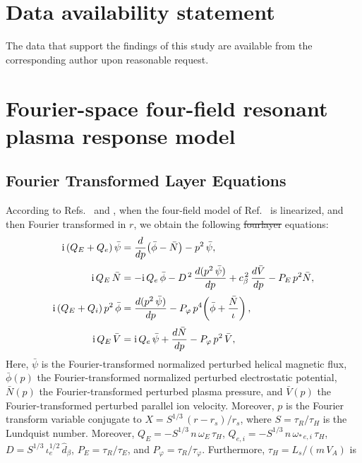 \documentclass[12pt,prb,aps]{revtex4-1}
\providecommand{\DIFadd}[1]{{\protect\color{blue}\uwave{#1}}} %
\providecommand{\DIFdel}[1]{{\protect\color{red}\sout{#1}}}                      %
\providecommand{\DIFaddbegin}{} %
\providecommand{\DIFaddend}{} %
\providecommand{\DIFdelbegin}{} %
\providecommand{\DIFdelend}{} %
\begin{document}
\section*{Data availability statement}
The data that support the findings of this study are available from the corresponding author upon reasonable request.

\appendix
\section{Fourier-space four-field resonant plasma response model}\label{sfour}

\subsection{Fourier Transformed Layer Equations}
According to Refs.~ and , when the four-field model of Ref.~ is linearized, and then Fourier transformed in
$r$,  we obtain the following \DIFdelbegin \DIFdel{fourlayer }\DIFdelend \DIFaddbegin \DIFadd{four-field  }\DIFaddend equations:
\begin{align}\label{e314}
{\rm i}\,(Q_E+Q_e)\,\bar{\psi}&=\frac{d}{dp}\!\left(\bar{\phi}-\bar{N}\right)-p^2\,\bar{\psi},\\[0.5ex]
{\rm i}\,Q_E\,\bar{N} &= - {\rm i}\,Q_{e}\,\bar{\phi} -D^{\,2}\,\frac{d(p^2\,\bar{\psi})}{dp}+ c_\beta^{\,2}\,\frac{d\bar{V}}{dp}
  - P_E\,p^2\bar{N},\label{e316}\\[0.5ex]
{\rm i}\,(Q_E+Q_i)\,p^2\,\bar{\phi}&=  \frac{d(p^2\,\bar{\psi})}{dp}- P_\varphi\,p^4\!\left(\bar{\phi} + \frac{\bar{N}}{\iota}\right),\label{e316a}\\[0.5ex]
{\rm i}\,Q_E\,\bar{V} &= {\rm i}\,Q_{e}\,\bar{\psi} +\frac{d\bar{N}}{dp}- P_\varphi\,p^2\,\bar{V},\label{e317}
\end{align}
Here, $\bar{\psi}$ is the Fourier-transformed normalized perturbed helical magnetic flux, $\bar{\phi}(p)$  the Fourier-transformed normalized perturbed
electrostatic potential, $\bar{N}(p)$  the Fourier-transformed perturbed plasma pressure, and $\bar{V}(p)$  the Fourier-transformed perturbed parallel
ion velocity. Moreover, $p$ is the Fourier transform variable conjugate to $X=S^{1/3}\,(r-r_s)/r_s$, where $S=\tau_R/\tau_H$ is the Lundquist number. 
Moreover, $Q_E=-S^{1/3}\,n\,\omega_E\,\tau_H$, $Q_{e,i}=-S^{1/3}\,n\,\omega_{\ast\,e,i}\,\tau_H$, $D=S^{1/3}\,\iota_e^{1/2}\,\hat{d}_\beta$, 
$P_E=\tau_R/\tau_E$, and $P_\varphi=\tau_R/\tau_\varphi$. Furthermore, $\tau_H=L_s/(m\,V_A)$ is
\end{document}
